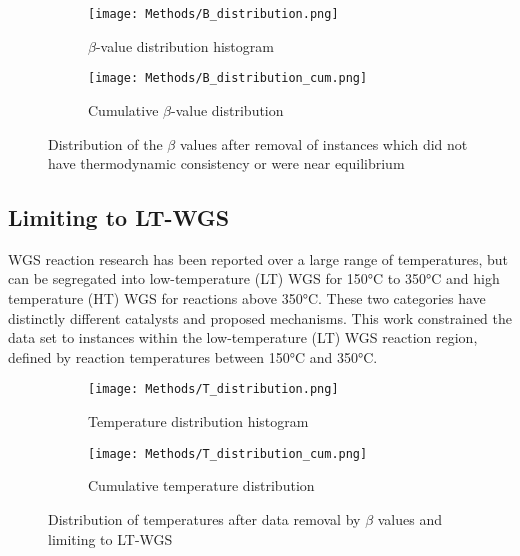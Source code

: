 	\begin{figure}[ht]
	    \centering
	    \begin{subfigure}[b]{0.49\textwidth}
	        \centering
	        \texttt{[image: Methods/B\_distribution.png]}
	        \caption{$\beta$-value distribution histogram}
	        \label{fig:B dist histogram}
	    \end{subfigure}
	    \begin{subfigure}[b]{0.49\textwidth}
	        \centering
	        \texttt{[image: Methods/B\_distribution\_cum.png]}
	        \caption{Cumulative $\beta$-value distribution}
	        \label{fig:B dist cum}
	    \end{subfigure}
	    \caption{Distribution of the $\beta$ values after removal of instances which did not have thermodynamic consistency or were near equilibrium}
	    \label{fig:Beta_dist}
	\end{figure}

	\subsection{Limiting to LT-WGS}
	WGS reaction research has been reported over a large range of temperatures, but can be segregated into low-temperature (LT) WGS for 150\si{\celsius} to 350\si{\celsius} and high temperature (HT) WGS for reactions above 350\si{\celsius}. These two categories have distinctly different catalysts and proposed mechanisms. This work constrained the data set to instances within the low-temperature (LT) WGS reaction region, defined by reaction temperatures between 150\si{\celsius} and 350\si{\celsius}. 
	\begin{figure}[ht]
	    \centering
	    \begin{subfigure}[b]{0.49\textwidth}
	        \centering
	        \texttt{[image: Methods/T\_distribution.png]}
	        \caption{Temperature distribution histogram}
	        \label{fig:T dis histogram}
	    \end{subfigure}
	    \begin{subfigure}[b]{0.49\textwidth}
	        \centering
	        \texttt{[image: Methods/T\_distribution\_cum.png]}
	        \caption{Cumulative temperature distribution}
	        \label{fig:T dist cum}
	    \end{subfigure}
	    \caption{Distribution of temperatures after data removal by  $\beta$ values and limiting to LT-WGS}
	    \label{fig:T_dist}
	\end{figure}


